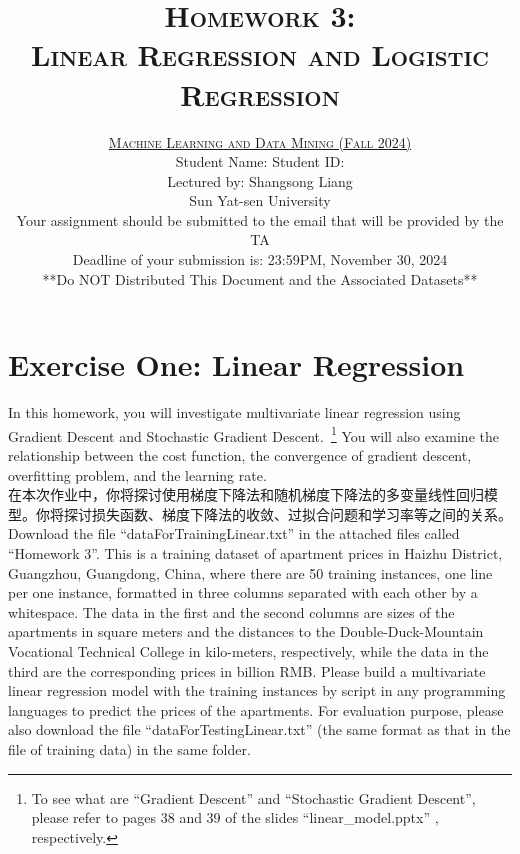 \documentclass[a4paper]{article}
\title{\textsc{Homework 3: \\  Linear Regression and Logistic Regression}} %
\author{\href{xx}{\textsc{Machine Learning and Data Mining (Fall 2024)}} \\[0.5em] 
Student Name: \hspace{13em} Student ID: \\[0.5em]
Lectured by: Shangsong Liang \\
Sun Yat-sen University\\
Your assignment should be submitted to the email that will be provided by the TA \\
Deadline of your submission is: 23:59PM, November 30, 2024\\
**Do NOT Distributed This Document and the Associated Datasets**}
\date{}
\theoremstyle{definition}
\begin{document}
\maketitle 
\section{Exercise One: Linear Regression}
In this homework, you will investigate multivariate linear regression using Gradient Descent  and Stochastic Gradient Descent.~\footnote{To see what are ``Gradient Descent'' and ``Stochastic Gradient Descent'', please refer to pages 38 and 39 of the slides ``linear\_model.pptx'' , respectively.} You will also examine the relationship between the cost function, the convergence of gradient descent, overfitting problem, and the learning rate.\\

在本次作业中，你将探讨使用梯度下降法和随机梯度下降法的多变量线性回归模型。你将探讨损失函数、梯度下降法的收敛、过拟合问题和学习率等之间的关系。\\

Download the file “dataForTrainingLinear.txt” in the attached files called “Homework 3”. This is a training dataset of apartment prices in Haizhu District, Guangzhou, Guangdong, China, where there are 50 training instances, one line per one instance, formatted in three columns separated with each other by a whitespace. The data in the first and the second columns are sizes of the apartments in square meters and the distances to the Double-Duck-Mountain Vocational Technical College in kilo-meters, respectively, while the data in the third are the corresponding prices in billion RMB. Please build a multivariate linear regression model with the training instances by script in any programming languages to predict the prices of the apartments. For evaluation purpose, please also download the file “dataForTestingLinear.txt” (the same format as that in the file of training data) in the same folder.\\
\end{document}
